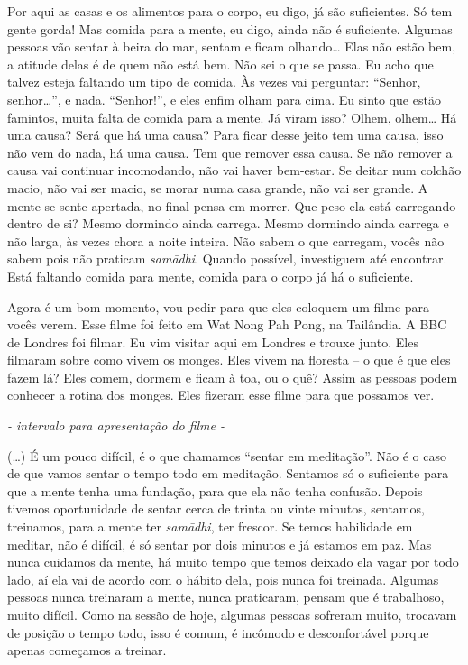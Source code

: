 Por aqui as casas e os alimentos para o corpo, eu digo, já são
suficientes. Só tem gente gorda! Mas comida para a mente, eu digo,
ainda não é suficiente. Algumas pessoas vão sentar à beira do mar,
sentam e ficam olhando… Elas não estão bem, a atitude delas é de quem
não está bem. Não sei o que se passa. Eu acho que talvez esteja
faltando um tipo de comida. Às vezes vai perguntar: “Senhor, senhor…”,
e nada. “Senhor!”, e eles enfim olham para cima. Eu sinto que estão
famintos, muita falta de comida para a mente. Já viram isso? Olhem,
olhem… Há uma causa? Será que há uma causa? Para ficar desse jeito tem
uma causa, isso não vem do nada, há uma causa. Tem que remover essa
causa. Se não remover a causa vai continuar incomodando, não vai haver
bem-estar. Se deitar num colchão macio, não vai ser macio, se morar
numa casa grande, não vai ser grande. A mente se sente apertada, no
final pensa em morrer. Que peso ela está carregando dentro de si? Mesmo
dormindo ainda carrega. Mesmo dormindo ainda carrega e não larga, às
vezes chora a noite inteira. Não sabem o que carregam, vocês não sabem
pois não praticam \textit{samādhi}. Quando possível, investiguem até
encontrar. Está faltando comida para mente, comida para o corpo já há o
suficiente.

Agora é um bom momento, vou pedir para que eles coloquem um filme
para vocês verem. Esse filme foi feito em Wat Nong Pah Pong, na
Tailândia. A BBC de Londres foi filmar. Eu vim visitar aqui em Londres
e trouxe junto. Eles filmaram sobre como vivem os monges. Eles vivem na
floresta – o que é que eles fazem lá? Eles comem, dormem e ficam à toa,
ou o quê? Assim as pessoas podem conhecer a rotina dos monges. Eles
fizeram esse filme para que possamos ver. 

{\itshape
- intervalo para apresentação do filme -}

(…) É um pouco difícil, é o que chamamos “sentar em meditação”. Não
é o caso de que vamos sentar o tempo todo em meditação. Sentamos só o
suficiente para que a mente tenha uma fundação, para que ela não tenha
confusão. Depois tivemos oportunidade de sentar cerca de trinta ou
vinte minutos, sentamos, treinamos, para a mente ter
\textit{samādhi}, ter frescor. Se temos habilidade em meditar, não é
difícil, é só sentar por dois minutos e já estamos em paz. Mas nunca
cuidamos da mente, há muito tempo que temos deixado ela vagar por todo
lado, aí ela vai de acordo com o hábito dela, pois nunca foi treinada.
Algumas pessoas nunca treinaram a mente, nunca praticaram, pensam que é
trabalhoso, muito difícil. Como na sessão de hoje, algumas pessoas
sofreram muito, trocavam de posição o tempo todo, isso é comum, é
incômodo e desconfortável porque apenas começamos a treinar.

